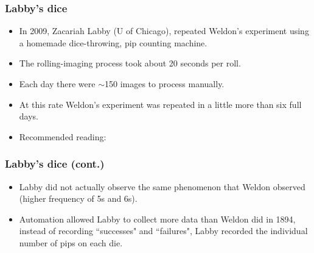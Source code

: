 \documentclass[slidestop,compress,mathserif]{beamer}
\begin{document}
\begin{frame}
\frametitle{Labby's dice}

{
\begin{itemize}

\item In 2009, Zacariah Labby (U of Chicago), repeated Weldon's experiment using a homemade dice-throwing, pip counting machine.
\begin{center}
\end{center}

\item The rolling-imaging process took about 20 seconds per roll.

\end{itemize}
}
{
\begin{center}
\end{center}
}

\begin{itemize}

\item Each day there were $\sim$150 images to process manually.

\item At this rate Weldon's experiment was repeated in a little more than six full days.

\item Recommended reading: 

\end{itemize}

\end{frame}


\begin{frame}
\frametitle{Labby's dice (cont.)}

\begin{itemize}

\item Labby did not actually observe the same phenomenon that Weldon observed (higher frequency of 5s and 6s).

\item Automation allowed Labby to collect more data than Weldon did in 1894, instead of recording ``successes" and ``failures", Labby recorded the individual number of pips on each die.

\end{itemize}

\begin{center}
\end{center}

\end{frame}
\end{document}
